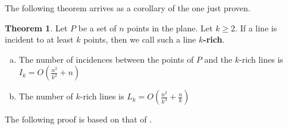 \documentclass{scrippsthesisclass}
\theoremstyle{definition}
\newtheorem{theorem}{Theorem}[section]
\begin{document}
The following theorem arrives as a corollary of the one just proven.

\begin{theorem}
    Let $P$ be a set of $n$ points in the plane.  
    Let $k \geq 2$. If a line is incident to at least $k$ points, then we call such a line \textbf{$k$-rich}. 
    \begin{enumerate}[(a)]
        \item The number of incidences between the points of $P$ and the $k$-rich lines is $I_k = O\left( \frac{n^2}{k^2} + n \right)$ 
        \item The number of $k$-rich lines is $L_k = O\left(\frac{n^2}{k^3} + \frac{n}{k} \right)$
    \end{enumerate}
\end{theorem}

The following proof is based on that of \cite{Solymosi2}.
\end{document}
